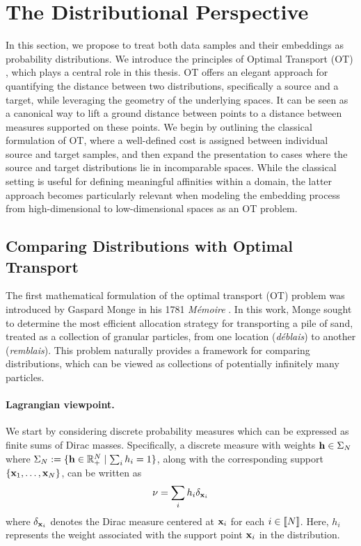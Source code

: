 \section{The Distributional Perspective}\label{sec:dist_perspective_dr}

In this section, we propose to treat both data samples and their embeddings as probability distributions. We introduce the principles of Optimal Transport (OT) \citep{villani2009optimal,peyre2019computational}, which plays a central role in this thesis. OT offers an elegant approach for quantifying the distance between two distributions, specifically a source and a target, while leveraging the geometry of the underlying spaces. It can be seen as a canonical way to lift a ground distance between points to a distance between measures supported on these points. We begin by outlining the classical formulation of OT, where a well-defined cost is assigned between individual source and target samples, and then expand the presentation to cases where the source and target distributions lie in incomparable spaces. While the classical setting is useful for defining meaningful affinities within a domain, the latter approach becomes particularly relevant when modeling the embedding process from high-dimensional to low-dimensional spaces as an OT problem.


\subsection{Comparing Distributions with Optimal Transport}\label{sec:background_ot}

The first mathematical formulation of the optimal transport (OT) problem was introduced by Gaspard Monge in his 1781 \textit{Mémoire} \citep{monge1781memoire}. In this work, Monge sought to determine the most efficient allocation strategy for transporting a pile of sand, treated as a collection of granular particles, from one location (\emph{déblais}) to another (\emph{remblais}). This problem naturally provides a framework for comparing distributions, which can be viewed as collections of potentially infinitely many particles.

\paragraph{Lagrangian viewpoint.} We start by considering discrete probability measures which can be expressed as finite sums of Dirac masses. Specifically, a discrete measure with weights ${\mathbf{h}} \in \Sigma_N$ where $\Sigma_N := \{{\mathbf{h}} \in \mathbb{R}_+^N \mid \sum_i h_i = 1\}$, along with the corresponding support $\{{\mathbf{x}}_1, \ldots, {\mathbf{x}}_N\}$, can be written as
\[
\nu = \sum_i h_i \delta_{{\mathbf{x}}_i}
\]
where $\delta_{{\mathbf{x}}_i}$ denotes the Dirac measure centered at ${\mathbf{x}}_i$ for each $i \in {[\![N]\!]}$. Here, \(h_i\) represents the weight associated with the support point \({\mathbf{x}}_i\) in the distribution.

